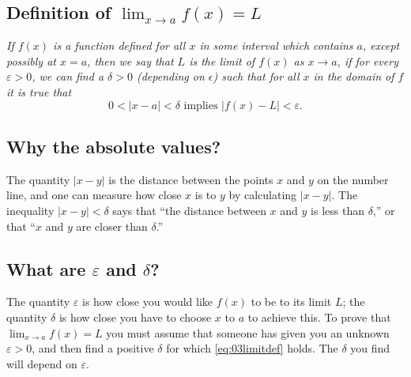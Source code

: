 \subsection{Definition of $\lim_{x\to a} f(x) = L$} 
\itshape%
If $f(x)$ is a function defined for all $x$ in some interval which contains $a$,
except possibly at $x=a$, then we say that $L$ is the limit of $f(x)$ as $x\to
a$, if for every $\varepsilon>0$, we can find a $\delta>0$ (depending on
$\epsilon$) such that for all $x$ in the domain of $f$ it is true that
\begin{equation}\label{eq:03limitdef}
    0 < |x-a| < \delta \text{ implies } |f(x) - L|<\varepsilon.
\end{equation}
\upshape

\subsection*{Why the absolute values? } 
The quantity $|x-y|$ is the distance between the points $x$ and $y$ on
the number line, and one can measure how close $x$ is to $y$ by
calculating $|x-y|$.  The inequality $|x-y|<\delta$ says that ``the
distance between $x$ and $y$ is less than $\delta$,'' or that ``$x$
and $y$ are closer than $\delta$.''

\subsection*{What are $\varepsilon$ and $\delta$?} 
The quantity $\varepsilon$ is how close you would like $f(x)$ to be to
its limit $L$; the quantity $\delta$ is how close you have to choose
$x$ to $a$ to achieve this.  To prove that $\lim_{x\to a} f(x) = L$
you must assume that someone has given you an unknown $\varepsilon>0$,
and then find a positive $\delta$ for which \eqref{eq:03limitdef}
holds.  The $\delta$ you find will depend on $\varepsilon$.


\begin{figure}
  

  

  
\end{figure}

